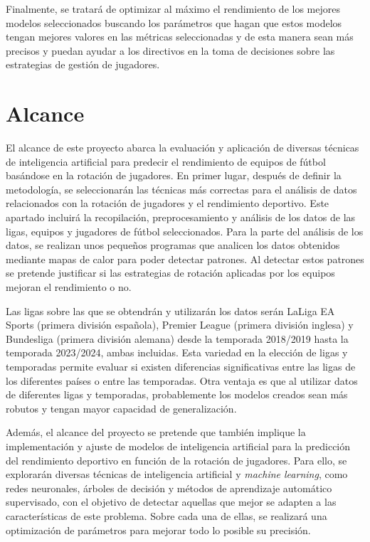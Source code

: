 Finalmente, se tratará de optimizar al máximo el rendimiento de los mejores modelos seleccionados buscando los parámetros que hagan que estos modelos tengan mejores valores en las métricas seleccionadas y de esta manera sean más precisos y puedan ayudar a los directivos en la toma de decisiones sobre las estrategias de gestión de jugadores.

\section{Alcance}
El alcance de este proyecto abarca la evaluación y aplicación de diversas técnicas de inteligencia artificial para predecir el rendimiento de equipos de fútbol basándose en la rotación de jugadores. En primer lugar, después de definir la metodología, se seleccionarán las técnicas más correctas para el análisis de datos relacionados con la rotación de jugadores y el rendimiento deportivo. Este apartado incluirá la recopilación, preprocesamiento y análisis de los datos de las ligas, equipos y jugadores de fútbol seleccionados. Para la parte del análisis de los datos, se realizan unos pequeños programas que analicen los datos obtenidos mediante mapas de calor para poder detectar patrones. Al detectar estos patrones se pretende justificar si las estrategias de rotación aplicadas por los equipos mejoran el rendimiento o no.

Las ligas sobre las que se obtendrán y utilizarán los datos serán LaLiga EA Sports (primera división española), Premier League (primera división inglesa) y Bundesliga (primera división alemana) desde la temporada 2018/2019 hasta la temporada 2023/2024, ambas incluidas. Esta
variedad en la elección de ligas y temporadas permite evaluar si existen diferencias significativas
entre las ligas de los diferentes países o entre las temporadas. Otra ventaja es que al utilizar datos de diferentes ligas y temporadas, probablemente los modelos creados sean más robutos y tengan mayor capacidad de generalización.

Además, el alcance del proyecto se pretende que también implique la implementación y ajuste de modelos de inteligencia artificial para la predicción del rendimiento deportivo en función de la rotación de jugadores. Para ello, se explorarán diversas técnicas de inteligencia artificial y \textit{machine learning}, como redes neuronales, árboles de decisión y métodos de aprendizaje automático supervisado, con el objetivo de detectar aquellas que mejor se adapten a las características de este problema. Sobre cada una de ellas, se realizará una optimización de parámetros para mejorar todo lo posible su precisión.

